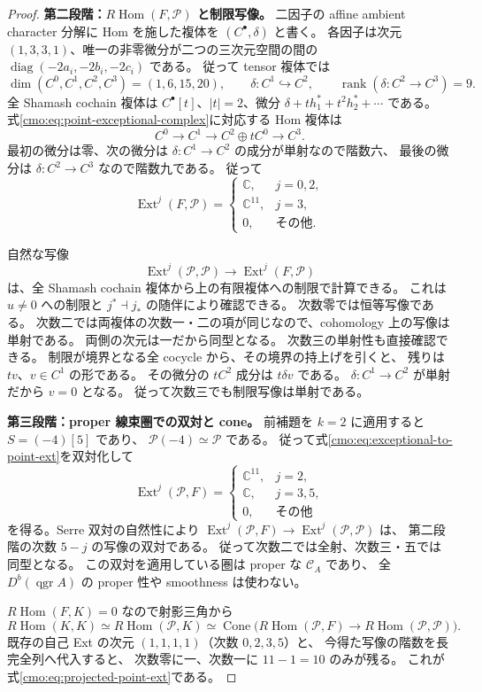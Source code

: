 \begin{proof}
\textbf{第二段階：$R\operatorname{Hom}(F,\mathcal P)$ と制限写像。}
二因子の affine ambient character 分解に Hom を施した複体を
$(C^\bullet,\delta)$ と書く。
各因子は次元 $(1,3,3,1)$、唯一の非零微分が二つの三次元空間の間の
$\operatorname{diag}(-2a_i,-2b_i,-2c_i)$ である。
従って tensor 複体では
\[
 \dim(C^0,C^1,C^2,C^3)=(1,6,15,20),\qquad
 \delta:C^1\hookrightarrow C^2,\qquad
 \operatorname{rank}(\delta:C^2\to C^3)=9.
\]
全 Shamash cochain 複体は
$C^\bullet[t]$、$|t|=2$、微分
$\delta+t h_1^*+t^2h_2^*+\cdots$ である。
式\eqref{cmo:eq:point-exceptional-complex}に対応する Hom 複体は
\[
 C^0\longrightarrow C^1\longrightarrow C^2\oplus tC^0
 \longrightarrow C^3.
\]
最初の微分は零、次の微分は $\delta:C^1\to C^2$ の成分が単射なので階数六、
最後の微分は $\delta:C^2\to C^3$ なので階数九である。
従って
\begin{equation}\label{cmo:eq:exceptional-to-point-ext}
 \operatorname{Ext}^j(F,\mathcal P)=
 \begin{cases}
 \mathbb C,&j=0,2,\\
 \mathbb C^{11},&j=3,\\
 0,&\text{その他}.
 \end{cases}
\end{equation}

自然な写像
\[
 \operatorname{Ext}^j(\mathcal P,\mathcal P)
 \longrightarrow\operatorname{Ext}^j(F,\mathcal P)
\]
は、全 Shamash cochain 複体から上の有限複体への制限で計算できる。
これは $u\ne0$ への制限と $j^*\dashv j_*$ の随伴により確認できる。
次数零では恒等写像である。
次数二では両複体の次数一・二の項が同じなので、cohomology 上の写像は単射である。
両側の次元は一だから同型となる。
次数三の単射性も直接確認できる。
制限が境界となる全 cocycle から、その境界の持上げを引くと、
残りは $t v$、$v\in C^1$ の形である。
その微分の $tC^2$ 成分は $t\delta v$ である。
$\delta:C^1\to C^2$ が単射だから $v=0$ となる。
従って次数三でも制限写像は単射である。

\textbf{第三段階：proper 線束圏での双対と cone。}
前補題を $k=2$ に適用すると $S=(-4)[5]$ であり、
$\mathcal P(-4)\simeq\mathcal P$ である。
従って式\eqref{cmo:eq:exceptional-to-point-ext}を双対化して
\[
 \operatorname{Ext}^j(\mathcal P,F)=
 \begin{cases}
 \mathbb C^{11},&j=2,\\
 \mathbb C,&j=3,5,\\
 0,&\text{その他}
 \end{cases}
\]
を得る。Serre 双対の自然性により
$\operatorname{Ext}^j(\mathcal P,F)\to
\operatorname{Ext}^j(\mathcal P,\mathcal P)$ は、
第二段階の次数 $5-j$ の写像の双対である。
従って次数二では全射、次数三・五では同型となる。
この双対を適用している圏は proper な $\mathcal C_A$ であり、
全 $D^b(\operatorname{qgr}A)$ の proper 性や smoothness は使わない。

$R\operatorname{Hom}(F,K)=0$ なので射影三角から
\[
 R\operatorname{Hom}(K,K)\simeq R\operatorname{Hom}(\mathcal P,K)
 \simeq\operatorname{Cone}\bigl(
 R\operatorname{Hom}(\mathcal P,F)\to
 R\operatorname{Hom}(\mathcal P,\mathcal P)\bigr).
\]
既存の自己 Ext の次元 $(1,1,1,1)$（次数 $0,2,3,5$）と、
今得た写像の階数を長完全列へ代入すると、
次数零に一、次数一に $11-1=10$ のみが残る。
これが式\eqref{cmo:eq:projected-point-ext}である。
\end{proof}


